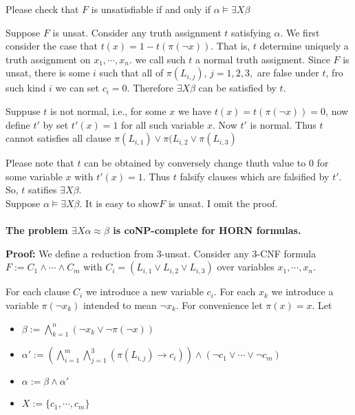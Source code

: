 \documentclass[12pt]{article}
\begin{document}
Please check that $F$ is unsatisfiable if and only if $\alpha\models \exists X\beta$

Suppose $F$ is unsat. Consider any truth assignment $t$ satisfying $\alpha$. We first consider the case that $t(x)=1-t(\pi(\neg x))$. That is, $t$ determine uniquely a truth assignment on $x_1,\cdots, x_n$. we call such $t$ a normal truth assigment. Since $F$ is unsat, there is some $i$ such that all of $\pi(L_{i,j})$, $j=1,2,3,$ are false under $t$, fro such kind $i$ we can set $c_i=0$. Therefore $\exists X\beta$ can be satisfied by $t$.

Suppuse $t$ is not normal, i.e., for some $x$ we have $t(x)=t(\pi(\neg x))=0$, now define $t'$ by set $t'(x)=1$ for all such variable $x$. Now $t'$ is normal. Thus $t$ cannot satisfies all clause $\pi(L_{i,1})\vee \pi(L_{i,2}\vee \pi(L_{i,3})$

Please note that $t$ can be obtained by conversely change thuth value to 0 for some variable $x$  with $t'(x)=1$. Thus $t$ falsify clauses which are falsified by $t'$. So, $t$ satifies $\exists X\beta$. \\

Suppose $\alpha\models \exists X\beta$. It is easy to show$F$ is unsat. I omit the proof.\\ \\


{\bf The problem $\exists X\alpha\approx\beta$ is coNP-complete for HORN formulas.}

{\bf Proof:} We define a reduction from 3-unsat. Consider any 3-CNF formula $F:=C_1\wedge\cdots\wedge C_m$ with $C_i=(L_{i,1}\vee L_{i,2}\vee L_{i,3})$ over variables $x_1,\cdots, x_n$.

For each clause $C_i$ we introduce a new variable $c_i$. For each $x_k$ we introduce a variable $\pi(\neg x_k)$ intended to mean $\neg x_k$. For convenience let $\pi(x)=x$. Let 

\begin{itemize}
\item $\beta:=\bigwedge_{k=1}^{n} (\neg x_k\vee \neg \pi(\neg x)) $

\item $\alpha':= \left(\bigwedge_{i=1}^{m}\bigwedge_{j=1}^{3}\left(\pi(L_{i,j})\rightarrow c_i\right)\right)\wedge (\neg c_1\vee\cdots\vee\neg c_m)$

\item $\alpha:=\beta\wedge \alpha'$

\item $X:=\{c_1,\cdots,c_m\}$
\end{itemize}
\end{document}
